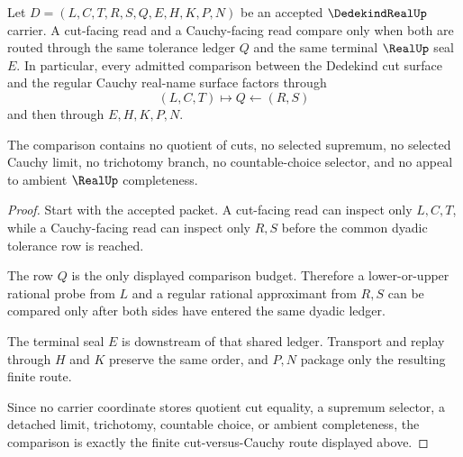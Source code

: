 \begin{theorem}
\label{thm:dedekind-real-cut-cauchy-comparison}
Let $D=(L,C,T,R,S,Q,E,H,K,P,N)$ be an accepted $\DedekindRealUp$ carrier. A cut-facing read and a Cauchy-facing read compare only when both are routed through the same tolerance ledger $Q$ and the same terminal $\RealUp$ seal $E$. In particular, every admitted comparison between the Dedekind cut surface and the regular Cauchy real-name surface factors through
$$
(L,C,T) \longmapsto Q \longleftarrow (R,S)
$$
and then through $E,H,K,P,N$.

The comparison contains no quotient of cuts, no selected supremum, no selected Cauchy limit, no trichotomy branch, no countable-choice selector, and no appeal to ambient $\RealUp$ completeness.
\end{theorem}
\begin{proof}
Start with the accepted packet. A cut-facing read can inspect only $L,C,T$, while a Cauchy-facing read can inspect only $R,S$ before the common dyadic tolerance row is reached.

The row $Q$ is the only displayed comparison budget. Therefore a lower-or-upper rational probe from $L$ and a regular rational approximant from $R,S$ can be compared only after both sides have entered the same dyadic ledger.

The terminal seal $E$ is downstream of that shared ledger. Transport and replay through $H$ and $K$ preserve the same order, and $P,N$ package only the resulting finite route.

Since no carrier coordinate stores quotient cut equality, a supremum selector, a detached limit, trichotomy, countable choice, or ambient completeness, the comparison is exactly the finite cut-versus-Cauchy route displayed above.
\end{proof}



